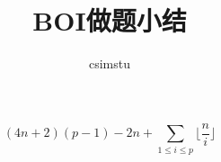 \documentclass{article}
\begin{document}
\title{BOI做题小结}
\author{csimstu}
\maketitle
\tableofcontents




\begin{displaymath}
(4n + 2)(p-1)-2n + \sum_{1 \le i \le p} \lfloor \frac{n}{i} \rfloor
\end{displaymath}
\end{document}
